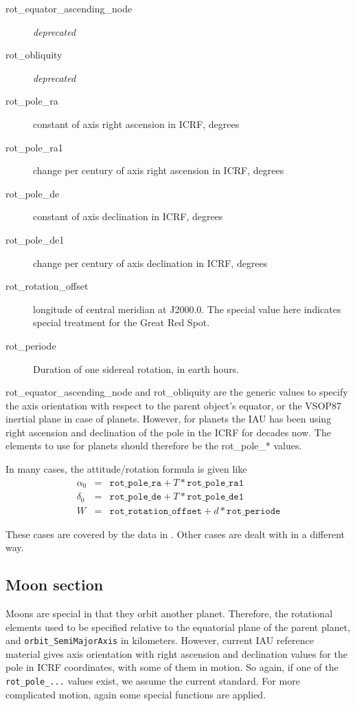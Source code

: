 \begin{description}
\item[rot\_equator\_ascending\_node] \emph{deprecated}
\item[rot\_obliquity] \emph{deprecated}
\item[rot\_pole\_ra]  constant of axis right ascension in ICRF, degrees
\item[rot\_pole\_ra1] change per century of axis right ascension in ICRF, degrees
\item[rot\_pole\_de] constant of axis declination in ICRF, degrees
\item[rot\_pole\_de1] change per century of axis declination in ICRF, degrees
\item[rot\_rotation\_offset] longitude of central meridian at J2000.0. 
                             The special value here indicates special treatment for the Great Red Spot.
\item[rot\_periode] Duration of one sidereal rotation, in earth hours.
\end{description}

rot\_equator\_ascending\_node and rot\_obliquity are the generic
values to specify the axis orientation with respect to the parent
object's equator, or the VSOP87 inertial plane in case of planets. However,
for planets the IAU has been using right ascension and declination of
the pole in the ICRF for decades now. The elements to use for planets
should therefore be the rot\_pole\_* values.

In many cases, the attitude/rotation formula is given like
\begin{eqnarray}
  \label{eq:PlanetOrientation}
  \alpha_0 &=& \mathtt{rot\_pole\_ra} + T * \mathtt{rot\_pole\_ra1}\\
  \delta_0 &=& \mathtt{rot\_pole\_de} + T * \mathtt{rot\_pole\_de1}\\
  W        &=& \mathtt{rot\_rotation\_offset} + d * \mathtt{rot\_periode}
\end{eqnarray}

These cases are covered by the data in . Other cases are dealt with in a different way.


\subsection{Moon section}
\label{sec:ssystem.ini:Moon}

Moons are special in that they orbit another planet. Therefore, the
rotational elements used to be specified relative to the equatorial plane of the
parent planet, and \texttt{orbit\_SemiMajorAxis} in kilometers. However, current IAU reference material gives axis orientation
with right ascension and declination values for the pole in ICRF
coordinates, with some of them in motion. So again, if one of the
\texttt{rot\_pole\_...} values exist, we assume the current
standard. For more complicated motion, again some special functions
are applied.

